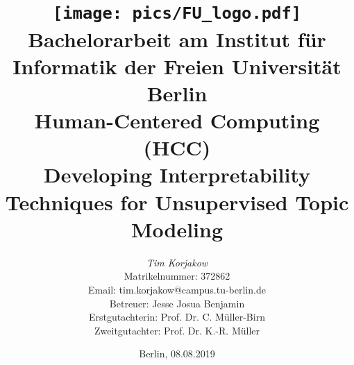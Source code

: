 %
\begin{titlepage}

\title{\texttt{[image: pics/FU\_logo.pdf]}\\
{\small Bachelorarbeit am Institut für Informatik der Freien Universität Berlin}\\
{\small Human-Centered Computing (HCC)}\\
[6ex]
{\LARGE Developing Interpretability Techniques for Unsupervised Topic Modeling}}

\author{
{\emph{\normalsize Tim Korjakow}}\\
{\normalsize Matrikelnummer: 372862}\\
{\normalsize Email: tim.korjakow@campus.tu-berlin.de}\\ 
[18ex]   
{\normalsize Betreuer: Jesse Josua Benjamin} \\
{\normalsize Erstgutachterin: Prof. Dr. C. Müller-Birn} \\
{\normalsize Zweitgutachter: Prof. Dr. K.-R. Müller}}
\vspace{6ex}
\date{\normalsize Berlin, 08.08.2019}
 
\maketitle  

\end{titlepage}